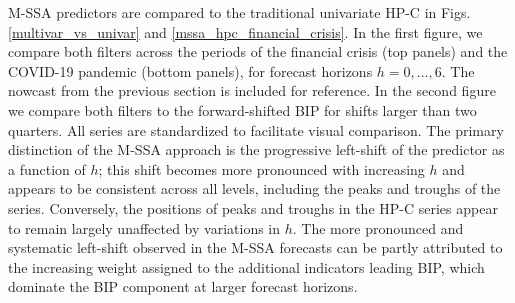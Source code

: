 \documentclass[a4paper]{article}
\begin{document}
M-SSA predictors are compared to the traditional univariate HP-C in Figs. \eqref{multivar_vs_univar} and \eqref{mssa_hpc_financial_crisis}. In the first figure, we compare both filters across the periods of the financial crisis (top panels) and the COVID-19 pandemic (bottom panels), for forecast horizons $h=0,...,6$. The nowcast from the previous section is included for reference. In the second figure we compare both filters to the forward-shifted BIP for shifts larger than two quarters. All series are standardized to facilitate visual comparison. The primary distinction of the M-SSA approach is the progressive left-shift of the predictor as a function of $h$; this shift becomes more pronounced with increasing $h$ and appears to be consistent across all levels, including the peaks and troughs of the series. Conversely, the positions of peaks and troughs in the HP-C series appear to remain largely unaffected by variations in $h$. The more pronounced and systematic left-shift observed in the M-SSA forecasts can be partly attributed to the increasing weight assigned to the additional indicators leading BIP, which dominate the BIP component at larger forecast horizons. %
\end{document}
